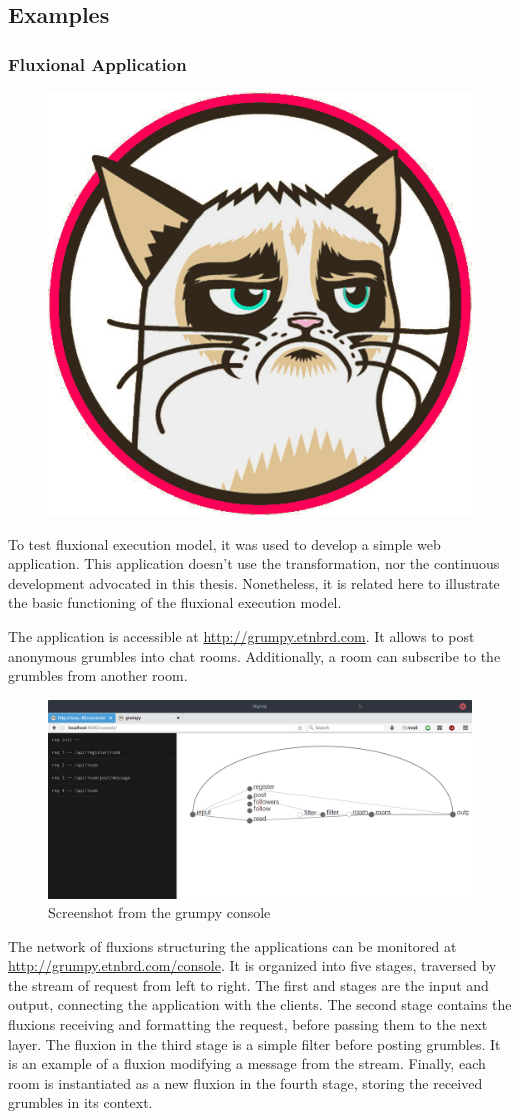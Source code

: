 \subsection{Examples}



\subsubsection{Fluxional Application}

\begin{figure}
  \centering
  \includegraphics[height=0.2\textwidth]{../resources/grumpy.png}
\end{figure}

To test fluxional execution model, it was used to develop a simple web application.
This application doesn't use the transformation, nor the continuous development advocated in this thesis.
Nonetheless, it is related here to illustrate the basic functioning of the fluxional execution model.

The application is accessible at \url{http://grumpy.etnbrd.com}.
It allows to post anonymous grumbles into chat rooms.
Additionally, a room can subscribe to the grumbles from another room.

\begin{figure}
  \label{fig:grumpy-screenshot}
  \includegraphics[width=\textwidth]{../resources/grumpy-console.png}
  \caption{Screenshot from the grumpy console}
\end{figure}

The network of fluxions structuring the applications can be monitored at \url{http://grumpy.etnbrd.com/console}.
It is organized into five stages, traversed by the stream of request from left to right.
The first and stages are the input and output, connecting the application with the clients.
The second stage contains the fluxions receiving and formatting the request, before passing them to the next layer.
The fluxion in the third stage is a simple filter before posting grumbles.
It is an example of a fluxion modifying a message from the stream.
Finally, each room is instantiated as a new fluxion in the fourth stage, storing the received grumbles in its context.

